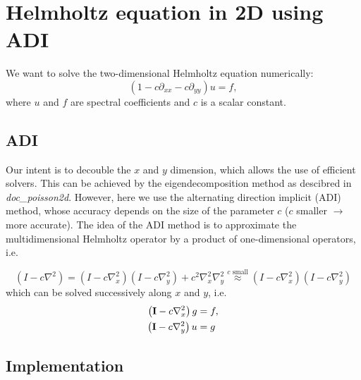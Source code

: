\documentclass[10pt,a4paper]{article}
\begin{document}
\section*{Helmholtz equation in 2D using ADI}
We want to solve the two-dimensional Helmholtz equation numerically:
\begin{equation}
(1  - c \partial_{xx} - c \partial_{yy}) u = f,
\end{equation}
where $u$ and $f$ are spectral coefficients and $c$ is a scalar constant. 

\subsection*{ADI}
Our intent is to decouble the $x$ and $y$ dimension, which allows the use of efficient solvers. This can be achieved by the eigendecomposition method as descibred in \textit{doc\_poisson2d}. However, here we use the alternating direction implicit (ADI) method, whose accuracy depends on the size of the parameter $c$ ($c$ smaller $\rightarrow$ more accurate). The idea of the ADI method is to approximate the multidimensional Helmholtz operator by a product of one-dimensional operators, i.e. 

\begin{equation}
    \left(I - c\nabla^2\right) = \left( I - c\nabla^2_{x} \right) \left( I - c\nabla^2_{y} \right) + c^2\nabla^2_x \nabla^2_y \stackrel{c \text{ small}}{\approx} \left( I - c\nabla^2_{x} \right) \left( I - c\nabla^2_{y} \right)
    \label{eq:2}
\end{equation}
which can be solved successively along $x$ and $y$, i.e.
\begin{align}
     \left( \mathbf{I} - c\nabla^2_{x} \right) g &= f, \notag\\
     \left( \mathbf{I} - c\nabla^2_{y} \right) u &= g
     \label{eq:3}
\end{align}

\subsection*{Implementation}
\end{document}

